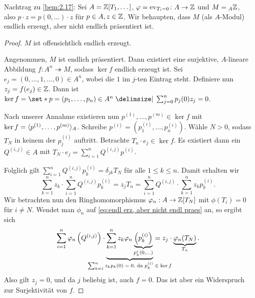 \documentclass[12pt,a4paper]{scrartcl}
\theoremstyle{cplain}
\theoremstyle{cdef}
\begin{document}
Nachtrag zu \cref{bem:2.17}: Sei $A = \mathbb Z[T_1,\dots]$, $\varphi = \operatorname{ev}_{T_i = 0}\colon A\to \mathbb Z$ und $M = {}_A\mathbb Z$, also $p\cdot z = p(0,\dots)\cdot z$ für $p\in A, z\in\mathbb Z$. Wir behaupten, dass $M$ (als $A$-Modul) endlich erzeugt, aber nicht endlich präsentiert ist.
\begin{proof}
	$M$ ist offensichtlich endlich erzeugt.
	
	Angenommen, $M$ ist endlich präsentiert. Dann existiert eine surjektive, $A$-lineare Abbildung $ f\colon A^n \twoheadrightarrow M$, sodass $\ker f$ endlich erzeugt ist.
	Sei $e_j = (0,\dots, 1,\dots, 0)\in A^n$, wobei die $1$ im $j$-ten Eintrag steht. Definiere nun $z_j = f(e_j)\in\mathbb Z$. Dann ist $\ker f = \set*{ p = (p_1,\dots, p_n)\in A^n \given \sum_{j=0}^n p_j(0)z_j = 0 }$.
	
	Nach unserer Annahme existieren nun $p^{(1)},\dots, p^{(m)}\in\ker f$ mit $\operatorname{ker} f = \langle p^{(1)},\dots, p^{(m)}\rangle_A$. Schreibe $p^{(i)} = \left(p_1^{(i)},\dots,p_n^{(i)}\right)$. Wähle $N>0$, sodass $T_N$ in keinem der $p_j^{(i)}$ auftritt. Betrachte $T_n\cdot e_j\in\ker f$. Es existiert dann ein $Q^{(i,j)}\in A$ mit $T_N\cdot e_j = \sum_{i = 1}^nQ^{(i,j)}p^{(i)}$.
	
	Folglich gilt $\sum_{i = 1}^n Q^{(i,j)}p_k^{(i)} = \delta_{jk}T_N$ für alle $1 \le k \le n$. Damit erhalten wir
	\begin{equation}
		\sum_{k=1}^n z_k \cdot \sum_{i=1}^n Q^{(i,j)} p_k^{(i)} = z_jT_n = \sum_{i=1}^nQ^{(i,j)} \cdot \sum_{k =1}^n z_kp_k^{(i)}.	\tag{*}\label{eq:endl erz, aber nicht endl praes}
	\end{equation}
	Wir betrachten nun den Ringhomomorphismus $\varphi_n : A \to \mathbb Z[T_N]$ mit $\phi(T_i) = 0$ für $i \neq N$. Wendet man $\phi_n$ auf \eqref{eq:endl erz, aber nicht endl praes} an, so ergibt sich
	\begin{align*}
		\sum_{i=1}^n \phi_n\left(Q^{(i,j)}\right) \cdot \underbrace{\sum_{k=1}^nz_k \phi_n\underbrace{\left(p_k^{(i)}\right)}_{p_k^{i}(0,\ldots)}}_{\mathclap{\text{$\sum_{k=1}^nz_kp_k(0) = 0$, da $p_k^{(i)} \in \ker f$}}} = z_j \cdot \underbrace{\phi_n(T_N)}_{T_n}.
	\end{align*}
	Also gilt $z_j = 0$, und da $j$ beliebig ist, auch $f=0$. Das ist aber ein Widerspruch zur Surjektivität von $f$.
\end{proof}
\end{document}
